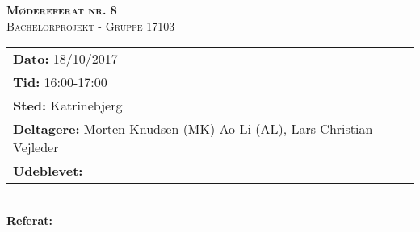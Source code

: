
\newcommand{\HRule}{\rule{\linewidth}{0.1mm}}


	\begin{center}
		{\huge \bfseries \textsc{Mødereferat nr. 8}}\\
		\textsc{\large Bachelorprojekt - Gruppe 17103}\\[0.3cm]
	\end{center}
	\begin{tabular}{ll}
	\large \textbf{Dato:} 18/10/2017  	\\ %
	\large \textbf{Tid:}  16:00-17:00 	\\ %
	\large \textbf{Sted:} Katrinebjerg		\\ %
	\large \textbf{Deltagere:} Morten Knudsen (MK) Ao Li (AL), Lars Christian - Vejleder \\
	\large \textbf{Udeblevet:} 
	\end{tabular}\\
	\phantom{\,}\hspace{0.1em} \large \textbf{Referat:}
